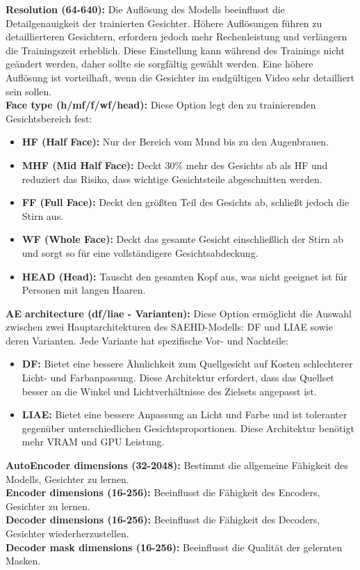 \textbf{Resolution (64-640):} Die Auflösung des Modells beeinflusst die Detailgenauigkeit der trainierten Gesichter.
Höhere Auflösungen führen zu detaillierteren Gesichtern, erfordern jedoch mehr Rechenleistung und verlängern die Trainingszeit erheblich.
Diese Einstellung kann während des Trainings nicht geändert werden, daher sollte sie sorgfältig gewählt werden.
Eine höhere Auflösung ist vorteilhaft, wenn die Gesichter im endgültigen Video sehr detailliert sein sollen.\\

\textbf{Face type (h/mf/f/wf/head):} Diese Option legt den zu trainierenden Gesichtsbereich fest:
\begin{itemize}
    \item \textbf{HF (Half Face):} Nur der Bereich vom Mund bis zu den Augenbrauen.
    \item \textbf{MHF (Mid Half Face):} Deckt 30\% mehr des Gesichts ab als HF und reduziert das Risiko, dass wichtige Gesichtsteile abgeschnitten werden.
    \item \textbf{FF (Full Face):} Deckt den größten Teil des Gesichts ab, schließt jedoch die Stirn aus.
    \item \textbf{WF (Whole Face):} Deckt das gesamte Gesicht einschließlich der Stirn ab und sorgt so für eine vollständigere Gesichtsabdeckung.
    \item \textbf{HEAD (Head):} Tauscht den gesamten Kopf aus, was nicht geeignet ist für Personen mit langen Haaren.
\end{itemize}

\textbf{AE architecture (df/liae - Varianten):} Diese Option ermöglicht die Auswahl zwischen zwei Hauptarchitekturen des SAEHD-Modells: DF und LIAE sowie deren Varianten.
Jede Variante hat spezifische Vor- und Nachteile:
\begin{itemize}
    \item \textbf{DF:} Bietet eine bessere Ähnlichkeit zum Quellgesicht auf Kosten schlechterer Licht- und Farbanpassung.
Diese Architektur erfordert, dass das Quellset besser an die Winkel und Lichtverhältnisse des Zielsets angepasst ist.
    \item \textbf{LIAE:} Bietet eine bessere Anpassung an Licht und Farbe und ist toleranter gegenüber unterschiedlichen Gesichtsproportionen.
Diese Architektur benötigt mehr VRAM und GPU Leistung.
\end{itemize}

\textbf{AutoEncoder dimensions (32-2048):} Bestimmt die allgemeine Fähigkeit des Modells, Gesichter zu lernen.\\
\textbf{Encoder dimensions (16-256):} Beeinflusst die Fähigkeit des Encoders, Gesichter zu lernen.\\
\textbf{Decoder dimensions (16-256):} Beeinflusst die Fähigkeit des Decoders, Gesichter wiederherzustellen.\\
\textbf{Decoder mask dimensions (16-256):} Beeinflusst die Qualität der gelernten Masken.\\

